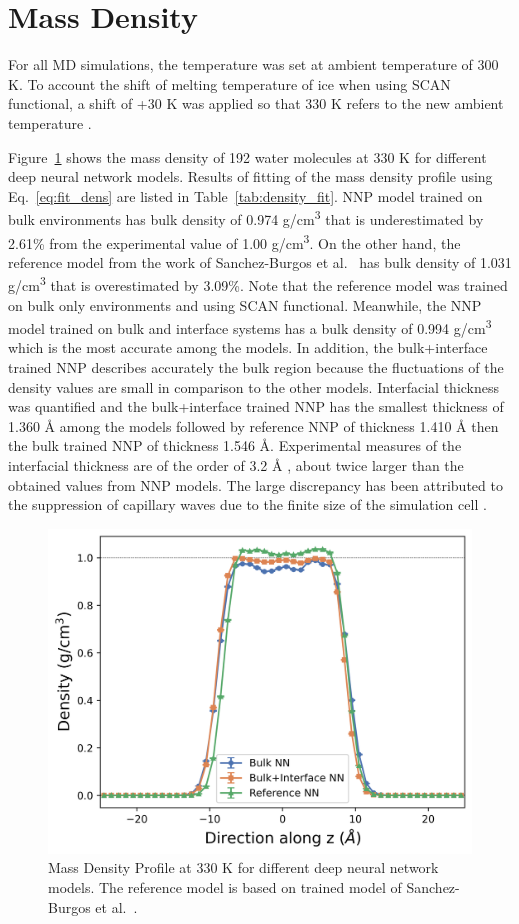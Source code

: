 \section{Mass Density}
For all MD simulations, the temperature was set at ambient temperature of 300
K. To account the shift of melting temperature of ice when using SCAN
functional,
a shift of +30 K was applied so that 330 K refers to the new ambient
temperature \cite{piaggi2021phase}.

Figure~\ref{fig:density} shows the mass density of 192 water molecules at 330 K
for different deep neural network models. Results of fitting of the mass density profile using Eq.~\ref{eq:fit_dens} are listed in Table~\ref{tab:density_fit}. NNP model trained on bulk
environments has bulk
density of 0.974 \unit{
	g/cm^3} that is underestimated by 2.61\% from the experimental value of 1.00 \unit{
	g/cm^3}. On the other hand, the reference model from the work of
Sanchez-Burgos et
al.~\cite{sanchez2023deep} has bulk density of 1.031 \unit{
	g/cm^3} that is overestimated by 3.09\%. Note that the
reference model was trained on bulk only environments and using SCAN
functional. Meanwhile,
the NNP model trained on  bulk and interface systems has a bulk density of  0.994 \unit{
	g/cm^3} which is the most accurate among the models. In addition, the bulk+interface trained NNP  describes	accurately the bulk region  because the fluctuations of the density values are small in
comparison to the other models. Interfacial thickness was quantified
and the bulk+interface trained NNP has the smallest thickness of 1.360 \unit{\angstrom} among the models followed by reference NNP of thickness 1.410  \unit{\angstrom} then the bulk trained NNP of thickness 1.546  \unit{\angstrom}. Experimental measures of the interfacial thickness are of the order of 3.2 \unit{\angstrom} \cite{braslau1985surface}, about twice larger than the obtained values from NNP models. The large discrepancy has been
attributed to the suppression of capillary waves due to the finite size of  the simulation cell \cite{matsumoto1988study}.




\begin{figure}[tbhp!]
	\centering
	\includegraphics[width=0.65\linewidth]{images/density_330.png}
	\caption{Mass Density Profile at 330 K for different deep neural
		network
		models. The reference model is based on trained model of
		Sanchez-Burgos et
		al.~\cite{sanchez2023deep}. }
	\label{fig:density}
\end{figure}


